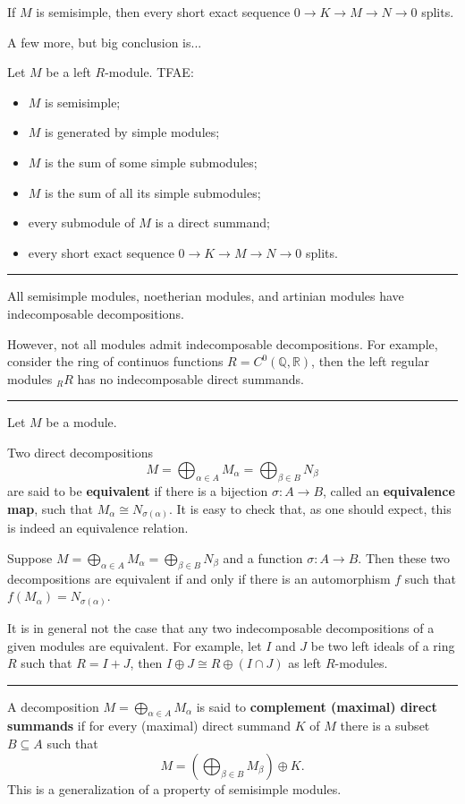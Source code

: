 \documentclass[12pt]{article}
\newcommand{\keyword}[1]{\textbf{#1}}
\newcommand{\sepline}{\rule{\textwidth}{0.4pt}}
\theoremstyle{definition}
\newcommand{\Q}{\mathbb{Q}}
\newcommand{\R}{\mathbb{R}}
\newcommand{\<}{\left\langle}
\renewcommand{\>}{\right\rangle}
\newcommand{\iso}{\cong}
\newcommand{\seq}{\subseteq}
\renewcommand{\_}[1]{{_{#1}}}
\begin{document}
If $M$ is semisimple, then every short exact sequence $0 \to K \to M \to N \to 0$ splits.

A few more, but big conclusion is...

Let $M$ be a left $R$-module. TFAE:
\begin{itemize}[nosep]
    \item $M$ is semisimple;
    \item $M$ is generated by simple modules;
    \item $M$ is the sum of some simple submodules;
    \item $M$ is the sum of all its simple submodules;
    \item every submodule of $M$ is a direct summand;
    \item every short exact sequence $0 \to K \to M \to N \to 0$ splits.
\end{itemize}

\sepline

All semisimple modules, noetherian modules, and artinian modules have indecomposable decompositions.

However, not all modules admit indecomposable decompositions.
For example, consider the ring of continuos functions $R = C^0(\Q, \R)$, then the left regular modules $\_RR$ has no indecomposable direct summands.

\sepline

Let $M$ be a module.

Two direct decompositions
\[
    M = \bigoplus_{\alpha \in A} M_\alpha = \bigoplus_{\beta \in B} N_\beta
\]
are said to be \keyword{equivalent} if there is a bijection $\sigma : A \to B$, called an \keyword{equivalence map}, such that $M_\alpha \iso N_{\sigma(\alpha)}$.
It is easy to check that, as one should expect, this is indeed an equivalence relation.

Suppose $M = \bigoplus_{\alpha \in A} M_\alpha = \bigoplus_{\beta \in B} N_\beta$ and a function $\sigma : A \to B$.
Then these two decompositions are equivalent if and only if there is an automorphism $f$ such that $f(M_\alpha) = N_{\sigma(\alpha)}$.

It is in general not the case that any two indecomposable decompositions of a given modules are equivalent.
For example, let $I$ and $J$ be two left ideals of a ring $R$ such that $R = I + J$, then $I \oplus J \iso R \oplus (I \cap J)$ as left $R$-modules.

\sepline

A decomposition $M = \bigoplus_{\alpha \in A} M_\alpha$ is said to \keyword{complement (maximal) direct summands} if for every (maximal) direct summand $K$ of $M$ there is a subset $B \seq A$ such that
\[\textstyle
    M = \left(\bigoplus_{\beta \in B} M_\beta \right)\oplus K.
\]
This is a generalization of a property of semisimple modules.
\end{document}
